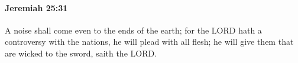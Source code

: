 
		\paragraph{Jeremiah 25:31} %
			\label{JEREMIAH-25-31}

			A noise shall come even to the ends of the earth; for the LORD hath a controversy with the nations, he will plead with all flesh; he will give them that are wicked to the sword, saith the LORD.



